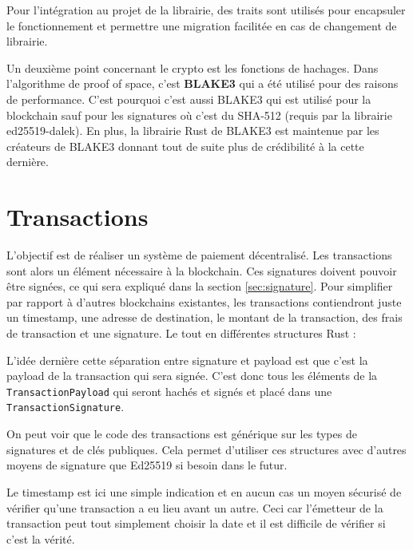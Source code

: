 Pour l'intégration au projet de la librairie, des traits sont utilisés pour encapsuler le fonctionnement et permettre une migration facilitée en cas de changement de librairie.

Un deuxième point concernant le crypto est les fonctions de hachages. Dans l'algorithme de proof of space, c'est \textbf{BLAKE3} qui a été utilisé pour des raisons de performance. C'est pourquoi c'est aussi BLAKE3 qui est utilisé pour la blockchain sauf pour les signatures où c'est du SHA-512 (requis par la librairie ed25519-dalek). En plus, la librairie Rust de BLAKE3 est maintenue par les créateurs de BLAKE3 donnant tout de suite plus de crédibilité à la cette dernière.

\section{Transactions}

L'objectif est de réaliser un système de paiement décentralisé. Les transactions sont alors un élément nécessaire à la blockchain. Ces signatures doivent pouvoir être signées, ce qui sera expliqué dans la section \ref{sec:signature}. Pour simplifier par rapport à d'autres blockchains existantes, les transactions contiendront juste un timestamp, une adresse de destination, le montant de la transaction, des frais de transaction et une signature. Le tout en différentes structures Rust :


L'idée dernière cette séparation entre signature et payload est que c'est la payload de la transaction qui sera signée. C'est donc tous les éléments de la \verb|TransactionPayload| qui seront hachés et signés et placé dans une \verb|TransactionSignature|.


On peut voir que le code des transactions est générique sur les types de signatures et de clés publiques. Cela permet d'utiliser ces structures avec d'autres moyens de signature que Ed25519 si besoin dans le futur.


Le timestamp est ici une simple indication et en aucun cas un moyen sécurisé de vérifier qu'une transaction a eu lieu avant un autre. Ceci car l'émetteur de la transaction peut tout simplement choisir la date et il est difficile de vérifier si c'est la vérité.

